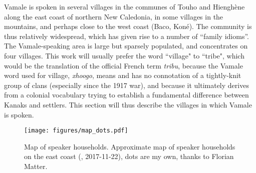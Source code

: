 Vamale is spoken in several villages in the communes of Touho and Hienghène along the east coast of northern New Caledonia, in some villages in the mountains, and perhaps close to the west coast (Baco, Koné). The community is thus relatively widespread, which has given rise to a number of “family idioms”.
The Vamale-speaking area is large but sparsely populated, and concentrates on four villages. This work will usually prefer the word ``village" to ``tribe", which would be the translation of the official French term \textit{tribu}, because the Vamale word used for village, \textit{xhoogo}, means  and has no connotation of a tightly-knit group of clans (especially since the 1917 war), and because it ultimately derives from a colonial vocabulary trying to establish a fundamental difference between Kanaks and settlers.
This section will thus describe the villages in which Vamale is spoken. 

\begin{figure}
	\texttt{[image: figures/map\_dots.pdf]}
	\caption{Map of speaker households. Approximate map of speaker households on the east coast (\citeauthor{gouvenementdelanouvelle-caledonie_explorateur_2019}, 2017-11-22), dots are my own, thanks to Florian Matter.}
	\label{map:dots}
\end{figure}


